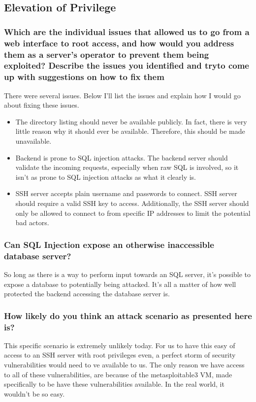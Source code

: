 \subsection{Elevation of Privilege}
\subsubsection{Which are the individual issues that allowed us to go from a web interface to root access, and how would you address them as a server's operator to prevent them being exploited? Describe the issues you identified and tryto come up with suggestions on how to fix them}

There were several issues. Below I'll list the issues and explain how I would go about fixing these issues.

\begin{itemize}
  \item The directory listing should never be available publicly. In fact, there is very little reason why it should ever be available. Therefore, this should be made unavailable.
  \item Backend is prone to SQL injection attacks. The backend server should validate the incoming requests, especially when raw SQL is involved, so it isn't as prone to SQL injection attacks as what it clearly is.
  \item SSH server accepts plain username and passwords to connect. SSH server should require a valid SSH key to access. Additionally, the SSH server should only be allowed to connect to from specific IP addresses to limit the potential bad actors.
\end{itemize}

\subsubsection{Can SQL Injection expose an otherwise inaccessible database server?}
So long as there is a way to perform input towards an SQL server, it's possible to expose a database to potentially being attacked. It's all a matter of how well protected the backend accessing the database server is.

\subsubsection{How likely do you think an attack scenario as presented here is?}
This specific scenario is extremely unlikely today. For us to have this easy of access to an SSH server with root privileges even, a perfect storm of security vulnerabilities would need to ve available to us. The only reason we have access to all of these vulnerabilities, are because of the metasploitable3 VM, made specifically to be have these vulnerabilities available. In the real world, it wouldn't be so easy.

